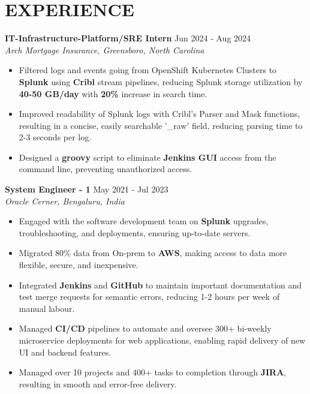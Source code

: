 \documentclass[a4paper,9pt]{extarticle}
\begin{document}
\section*{EXPERIENCE}
\noindent
\textbf{IT-Infrastructure-Platform/SRE Intern}
\hfill Jun 2024 - Aug 2024\\ %
\textit{Arch Mortgage Insurance, Greensboro, North Carolina}
\begin{itemize}
    \item Filtered logs and events going from OpenShift Kubernetes Clusters to \textbf{Splunk} using \textbf{Cribl} stream pipelines, reducing Splunk storage utilization by \textbf{40-50 GB/day} with \textbf{20\%} increase in search time.
    \item Improved readability of Splunk logs with Cribl's Parser and Mask functions, resulting in a concise, easily searchable '\_raw' field, reducing parsing time to 2-3 seconds per log.
    \item Designed a \textbf{groovy} script to eliminate \textbf{Jenkins GUI} access from the command line, preventing unauthorized access.
    

\end{itemize}

\noindent
\textbf{System Engineer - 1}
\hfill May 2021 - Jul 2023\\ %
\textit{Oracle Cerner, Bengaluru, India}
\begin{itemize}
    \item Engaged with the software development team on \textbf{Splunk} upgrades, troubleshooting, and deployments, ensuring up-to-date servers.
    \item Migrated 80\% data from On-prem to \textbf{AWS}, making access to data more flexible, secure, and inexpensive.
    \item Integrated \textbf{Jenkins} and \textbf{GitHub} to maintain important documentation and test merge requests for semantic errors, reducing 1-2 hours per week of manual labour.
    \item Managed \textbf{CI/CD} pipelines to automate and oversee 300+ bi-weekly microservice deployments for web applications, enabling rapid delivery of new UI and backend features.
    \item Managed over 10 projects and 400+ tasks to completion through \textbf{JIRA}, resulting in smooth and error-free delivery. 
\end{itemize}
\end{document}
